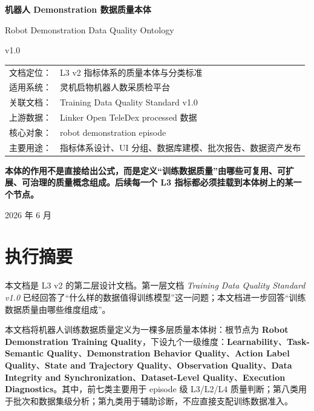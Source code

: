 \documentclass[UTF8,zihao=-4]{ctexart}
\newcommand{\Term}[1]{\textbf{#1}}
\begin{document}
\begin{titlepage}
\centering
\vspace*{2.5cm}
{\Huge\bfseries 机器人 Demonstration 数据质量本体\par}
\vspace{0.35cm}
{\Large Robot Demonstration Data Quality Ontology\par}
\vspace{0.6cm}
{\LARGE v1.0\par}
\vspace{1.2cm}
\begin{tabular}{rl}
文档定位： & L3 v2 指标体系的质量本体与分类标准 \\
适用系统： & 灵机启物机器人数采质检平台 \\
关联文档： & Training Data Quality Standard v1.0 \\
上游数据： & Linker Open TeleDex processed 数据 \\
核心对象： & robot demonstration episode \\
主要用途： & 指标体系设计、UI 分组、数据库建模、批次报告、数据资产发布 \\
\end{tabular}
\vfill
\begin{minipage}{0.86\linewidth}
\centering\large\bfseries
本体的作用不是直接给出公式，而是定义“训练数据质量”由哪些可复用、可扩展、可治理的质量概念组成。后续每一个 L3 指标都必须挂载到本体树上的某一个节点。
\end{minipage}
\vfill
{\large 2026 年 6 月\par}
\end{titlepage}

\tableofcontents
\newpage

\section*{执行摘要}

本文档是 L3 v2 的第二层设计文档。第一层文档 \emph{Training Data Quality Standard v1.0} 已经回答了“什么样的数据值得训练模型”这一问题；本文档进一步回答“训练数据质量由哪些维度组成”。

本文档将机器人训练数据质量定义为一棵多层质量本体树：根节点为 \Term{Robot Demonstration Training Quality}，下设九个一级维度：\Term{Learnability}、\Term{Task-Semantic Quality}、\Term{Demonstration Behavior Quality}、\Term{Action Label Quality}、\Term{State and Trajectory Quality}、\Term{Observation Quality}、\Term{Data Integrity and Synchronization}、\Term{Dataset-Level Quality}、\Term{Execution Diagnostics}。其中，前七类主要用于 episode 级 L3/L2/L4 质量判断；第八类用于批次和数据集级分析；第九类用于辅助诊断，不应直接支配训练数据准入。
\end{document}
